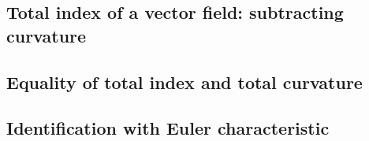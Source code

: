 \subsection{Total index of a vector field: subtracting curvature}

\subsection{Equality of total index and total curvature}

\subsection{Identification with Euler characteristic}


